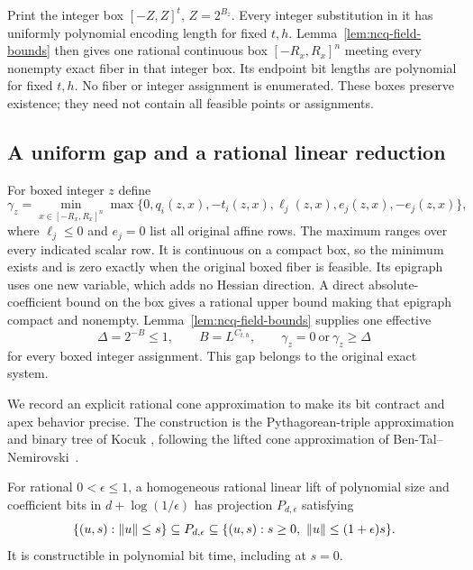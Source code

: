 Print the integer box $[-Z,Z]^t$, $Z=2^{B_z}$. Every integer substitution
in it has uniformly polynomial encoding length for fixed $t,h$.
Lemma~\ref{lem:ncq-field-bounds} then gives one rational continuous box
$[-R_x,R_x]^n$ meeting every nonempty exact fiber in that integer box.
Its endpoint bit lengths are polynomial for fixed $t,h$. No fiber or
integer assignment is enumerated. These boxes preserve existence; they
need not contain all feasible points or assignments.

\subsection{A uniform gap and a rational linear reduction}
\label{app:cone-gap}

For boxed integer $z$ define
\begin{equation}
\label{eq:cone-residual-value}
 \gamma_z=\min_{x\in[-R_x,R_x]^n}
 \max\{0,q_i(z,x),-t_i(z,x),\ell_j(z,x),e_j(z,x),-e_j(z,x)\},
\end{equation}
where $\ell_j\le0$ and $e_j=0$ list all original affine rows.
The maximum ranges over every indicated scalar row. It is continuous
on a compact box, so the minimum exists and is zero exactly when the
original boxed fiber is feasible. Its epigraph uses one new variable,
which adds no Hessian direction. A direct absolute-coefficient bound on
the box gives a rational upper bound making that epigraph compact and
nonempty. Lemma~\ref{lem:ncq-field-bounds} supplies one effective
\begin{equation}
\label{eq:cone-gap}
 \Delta=2^{-B}\le1,\qquad B=L^{C_{t,h}},\qquad
                \gamma_z=0\ \text{or}\ \gamma_z\ge\Delta
\end{equation}
for every boxed integer assignment. This gap belongs to the original
exact system.

We record an explicit rational cone approximation to make its bit
contract and apex behavior precise. The construction is the
Pythagorean-triple approximation and binary tree of Kocuk
\cite[Sections~2.3 and 3.3]{Kocuk2021}, following the lifted cone
approximation of Ben-Tal--Nemirovski~\cite{BenTalNemirovski2001}.

\begin{lemma}
\label{lem:cone-rational-lift}
For rational $0<\epsilon\le1$, a homogeneous rational linear lift of
polynomial size and coefficient bits in $d+\log(1/\epsilon)$ has
projection $P_{d,\epsilon}$ satisfying
\[
 \{(u,s):\left\lVert u\right\rVert\le s\}\subseteq P_{d,\epsilon}
 \subseteq\{(u,s):s\ge0,\ \left\lVert u\right\rVert\le(1+\epsilon)s\}.
\]
It is constructible in polynomial bit time, including at $s=0$.
\end{lemma}

